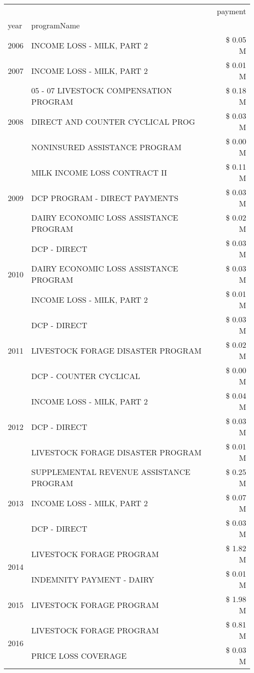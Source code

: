 \begin{tabular}{llr}
\toprule
 &  & payment \\
year & programName &  \\
\midrule
2006 & INCOME LOSS - MILK, PART 2 & \$ 0.05 M \\
\cline{1-3}
2007 & INCOME LOSS - MILK, PART 2 & \$ 0.01 M \\
\cline{1-3}
\multirow[t]{3}{*}{2008} & 05 - 07 LIVESTOCK COMPENSATION PROGRAM & \$ 0.18 M \\
 & DIRECT AND COUNTER CYCLICAL PROG & \$ 0.03 M \\
 & NONINSURED ASSISTANCE PROGRAM & \$ 0.00 M \\
\cline{1-3}
\multirow[t]{3}{*}{2009} & MILK INCOME LOSS CONTRACT II & \$ 0.11 M \\
 & DCP PROGRAM - DIRECT PAYMENTS & \$ 0.03 M \\
 & DAIRY ECONOMIC LOSS ASSISTANCE PROGRAM & \$ 0.02 M \\
\cline{1-3}
\multirow[t]{3}{*}{2010} & DCP - DIRECT & \$ 0.03 M \\
 & DAIRY ECONOMIC LOSS ASSISTANCE PROGRAM & \$ 0.03 M \\
 & INCOME LOSS - MILK, PART 2 & \$ 0.01 M \\
\cline{1-3}
\multirow[t]{3}{*}{2011} & DCP - DIRECT & \$ 0.03 M \\
 & LIVESTOCK FORAGE DISASTER PROGRAM & \$ 0.02 M \\
 & DCP - COUNTER CYCLICAL & \$ 0.00 M \\
\cline{1-3}
\multirow[t]{3}{*}{2012} & INCOME LOSS - MILK, PART 2 & \$ 0.04 M \\
 & DCP - DIRECT & \$ 0.03 M \\
 & LIVESTOCK FORAGE DISASTER PROGRAM & \$ 0.01 M \\
\cline{1-3}
\multirow[t]{3}{*}{2013} & SUPPLEMENTAL REVENUE ASSISTANCE PROGRAM & \$ 0.25 M \\
 & INCOME LOSS - MILK, PART 2 & \$ 0.07 M \\
 & DCP - DIRECT & \$ 0.03 M \\
\cline{1-3}
\multirow[t]{2}{*}{2014} & LIVESTOCK FORAGE PROGRAM & \$ 1.82 M \\
 & INDEMNITY PAYMENT - DAIRY & \$ 0.01 M \\
\cline{1-3}
2015 & LIVESTOCK FORAGE PROGRAM & \$ 1.98 M \\
\cline{1-3}
\multirow[t]{2}{*}{2016} & LIVESTOCK FORAGE PROGRAM & \$ 0.81 M \\
 & PRICE LOSS COVERAGE & \$ 0.03 M \\

\end{tabular}
